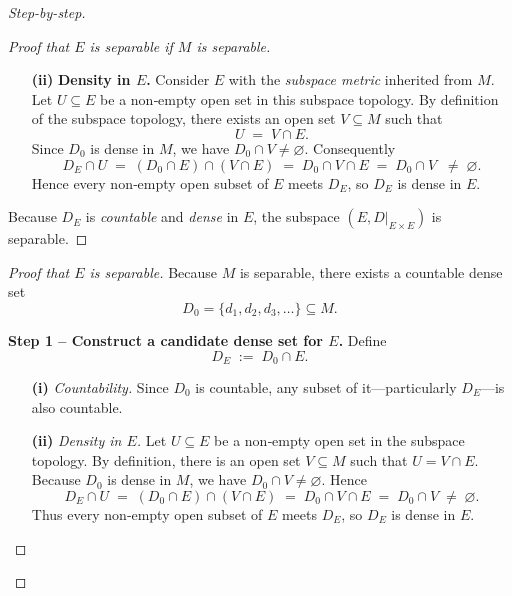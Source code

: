\documentclass[12pt]{article}
\theoremstyle{definition} %
\theoremstyle{plain} %
\begin{document}
\begin{proof}[Step-by-step]
\begin{proof}[Proof that \(E\) is separable if \(M\) is separable]
\begin{enumerate}
      \item[\textbf{(ii)}] \textbf{Density in \(E\).}  
            Consider \(E\) with the \emph{subspace metric} inherited from
            \(M\).  Let \(U\subseteq E\) be a non‑empty open set in this
            subspace topology.  By definition of the subspace topology, there
            exists an open set \(V\subseteq M\) such that
            \[
                U \;=\; V\cap E.
            \]
            Since \(D_0\) is dense in \(M\), we have \(D_0\cap V\neq\varnothing\).
            Consequently
            \[
                D_E\cap U
                \;=\;(D_0\cap E)\cap(V\cap E)
                \;=\;D_0\cap V\cap E
                \;=\;D_0\cap V
                \;\;\neq\;\varnothing.
            \]
            Hence every non‑empty open subset of \(E\) meets \(D_E\), so
            \(D_E\) is dense in \(E\).
  \end{enumerate}
  
  Because \(D_E\) is \emph{countable} and \emph{dense} in \(E\), the subspace
  \((E,D|_{E\times E})\) is separable.  \qedhere
  \end{proof}

\begin{proof}[Proof that \(E\) is separable]
  Because \(M\) is separable, there exists a countable dense set
  \[
      D_0=\{d_1,d_2,d_3,\dots\}\subseteq M.
  \]
  
  \medskip
  \noindent\textbf{Step 1 – Construct a candidate dense set for \(E\).}
  Define
  \[
      D_E \;:=\; D_0\cap E.
  \]
  
  \begin{enumerate}
      \item[\textbf{(i)}] \emph{Countability.}
            Since \(D_0\) is countable, any subset of it—particularly
            \(D_E\)—is also countable.
  
      \item[\textbf{(ii)}] \emph{Density in \(E\).}
            Let \(U\subseteq E\) be a non‑empty open set in the
            subspace topology.  By definition, there is an open set
            \(V\subseteq M\) such that \(U = V\cap E\).
            Because \(D_0\) is dense in \(M\), we have \(D_0\cap V\neq\varnothing\).
            Hence
            \[
                D_E\cap U
                \;=\;(D_0\cap E)\cap(V\cap E)
                \;=\;D_0\cap V\cap E
                \;=\;D_0\cap V
                \;\neq\;\varnothing.
            \]
            Thus every non‑empty open subset of \(E\) meets \(D_E\), so
            \(D_E\) is dense in \(E\).
  \end{enumerate}
  

\end{proof}
\end{proof}
\end{document}
